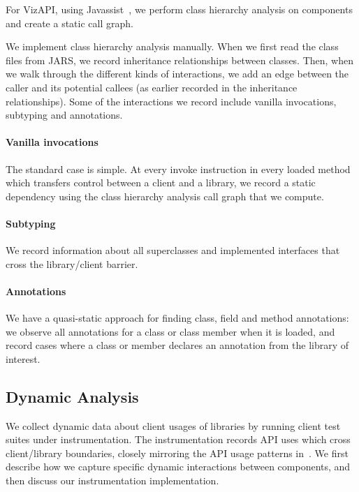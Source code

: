For VizAPI, using Javassist~\cite{chiba00:_load_struc_reflec_java}, we 
perform class hierarchy analysis on components and create a static call
graph. 

We implement class hierarchy analysis manually. When we first read the class files from JARS, we record
inheritance relationships between classes. Then, when we walk through the different kinds of interactions,
 we add an edge between the caller and its potential callees
(as earlier recorded in the inheritance relationships). 
Some of the interactions we record include vanilla invocations, subtyping and annotations.

\paragraph{Vanilla invocations}
The standard case is simple. At every invoke instruction in every
loaded method which transfers control between a client and a
library, we record a static dependency using the class hierarchy
analysis call graph that we compute.

\paragraph{Subtyping}
We record information about all superclasses and implemented interfaces that cross the library/client barrier. 

\paragraph{Annotations}
We have a quasi-static approach for finding class, field and method annotations:
we observe all annotations for a class or class member when it is loaded, and
record cases where a class or member declares an annotation from the library of interest.

\subsection{Dynamic Analysis}
\label{subsec:dynamic}
We collect dynamic data about client usages of libraries by running client
test suites under instrumentation. The instrumentation records API
uses which cross client/library boundaries, closely mirroring the API
usage patterns
in~\cite{venkatanarayanan22:_study_lever_api_usage_patter}. We first
describe how we capture specific dynamic interactions between components, and
then discuss our instrumentation implementation.

